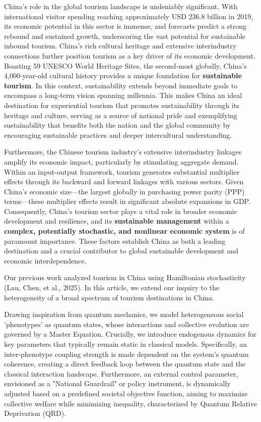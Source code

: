 \documentclass[9pt]{article}
\begin{document}
China's role in the global tourism landscape is undeniably significant. With international visitor spending reaching approximately USD 236.8 billion in 2019, its economic potential in this sector is immense, and forecasts predict a strong rebound and sustained growth, underscoring the vast potential for sustainable inbound tourism. China's rich cultural heritage and extensive interindustry connections further position tourism as a key driver of its economic development. Boasting 59 UNESCO World Heritage Sites, the second-most globally, China's 4,000-year-old cultural history provides a unique foundation for \textbf{sustainable tourism}. In this context, sustainability extends beyond immediate goals to encompass a long-term vision spanning millennia. This makes China an ideal destination for experiential tourism that promotes sustainability through its heritage and culture, serving as a source of national pride and exemplifying sustainability that benefits both the nation and the global community by encouraging sustainable practices and deeper intercultural understanding.

Furthermore, the Chinese tourism industry's extensive interindustry linkages amplify its economic impact, particularly by stimulating aggregate demand. Within an input-output framework, tourism generates substantial multiplier effects through its backward and forward linkages with various sectors. Given China's economic size---the largest globally in purchasing power parity (PPP) terms---these multiplier effects result in significant absolute expansions in GDP. Consequently, China's tourism sector plays a vital role in broader economic development and resilience, and its \textbf{sustainable management} within a \textbf{complex, potentially stochastic, and nonlinear economic system} is of paramount importance. These factors establish China as both a leading destination and a crucial contributor to global sustainable development and economic interdependence.

Our previous work analyzed tourism in China using Hamiltonian stochasticity (Lau, Chen, et al., 2025). In this article, we extend our inquiry to the heterogeneity of a broad spectrum of tourism destinations in China.

Drawing inspiration from quantum mechanics, we model heterogeneous social 'phenotypes' as quantum states, whose interactions and collective evolution are governed by a Master Equation. Crucially, we introduce endogenous dynamics for key parameters that typically remain static in classical models. Specifically, an inter-phenotype coupling strength is made dependent on the system's quantum coherence, creating a direct feedback loop between the quantum state and the classical interaction landscape. Furthermore, an external control parameter, envisioned as a "National Guardrail" or policy instrument, is dynamically adjusted based on a predefined societal objective function, aiming to maximize collective welfare while minimizing inequality, characterized by Quantum Relative Deprivation (QRD).
\end{document}
